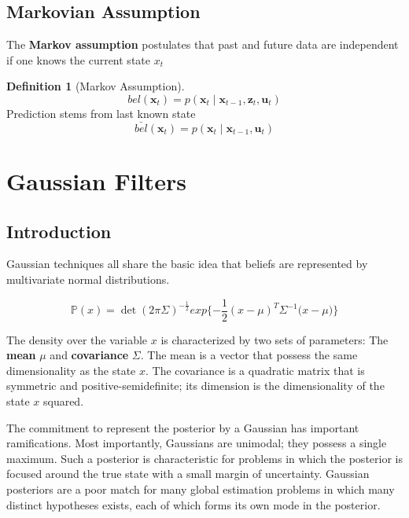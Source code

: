 \documentclass[14pt,letterpaper]{article}
\theoremstyle{definition}
\newtheorem{definition}{Definition}[section]
\newcommand{\prob}[1]{\mathbb{P}\left(#1\right)}
\newcommand{\state}{\bm{x}}
\newcommand{\obs}{\bm{z}}
\newcommand{\control}{\bm{u}}
\begin{document}
\subsection{Markovian Assumption}

The \textbf{Markov assumption} postulates that past and future data are independent if one knows the current state $x_t$

\begin{definition}[Markov Assumption]
\begin{equation}
    bel(\state_{t}) = p(\state_{t} \mid \state_{t-1}, \obs_{t}, \control_{t})
\end{equation}
\indent Prediction stems from last known state
\begin{equation}
    \bar{bel}(\state_{t}) = p(\state_{t} \mid \state_{t-1}, \control_{t})
\end{equation}
\end{definition}

\newpage

\section{Gaussian Filters}

\subsection{Introduction}

Gaussian techniques all share the basic idea that beliefs are represented by multivariate normal distributions.

\begin{equation}
  \prob{x} = \det{(2\pi\Sigma)^{-\frac{1}{2}}} exp{\{-\frac{1}{2}(x-\mu)^{T}\Sigma^{-1}(x-\mu})\}
\end{equation}

The density over the variable $x$ is characterized by two sets of parameters: The \textbf{mean} $\mu$ and \textbf{covariance} $\Sigma$.
The mean is a vector that possess the same dimensionality as the state $x$.
The covariance is a quadratic matrix that is symmetric and positive-semidefinite; its dimension is the dimensionality of the state $x$ squared.

\vspace{2mm}

The commitment to represent the posterior by a Gaussian has important ramifications.
Most importantly, Gaussians are unimodal; they possess a single maximum.
Such a posterior is characteristic for problems in which the posterior is focused around the true state with a small margin of uncertainty.
Gaussian posteriors are a poor match for many global estimation problems in which many distinct hypotheses exists, each of which forms its own mode in the posterior.
\end{document}
